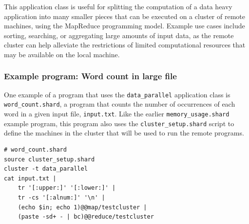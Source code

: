 \documentclass[oneside]{report}
\begin{document}
This application class is useful for splitting the computation of a data heavy application into many smaller pieces that can be executed on a cluster of remote machines, using the MapReduce programming model.
Example use cases include sorting, searching, or aggregating large amounts of input data, as the remote cluster can help alleviate the restrictions of limited computational resources that may be available on the local machine.

\subsubsection{Example program: Word count in large file}

\begin{sloppypar}
  One example of a program that uses the \texttt{data\_parallel} application class is \texttt{word\_count.shard}, a program that counts the number of occurrences of each word in a given input file, \texttt{input.txt}.
  Like the earlier \texttt{memory\_usage.shard} example program, this program also uses the \texttt{cluster\_setup.shard} script to define the machines in the cluster that will be used to run the remote programs.
\end{sloppypar}

\begin{minipage}[c]{\textwidth-15pt}
  \begin{lstlisting}[language=Shard]
# word_count.shard
source cluster_setup.shard
cluster -t data_parallel
cat input.txt |
    tr '[:upper:]' '[:lower:]' |
    tr -cs '[:alnum:]' '\n' |
    (echo $in; echo 1)@@map/testcluster |
    (paste -sd+ - | bc)@@reduce/testcluster
\end{lstlisting}
  \smallskip
\end{minipage}
\end{document}

